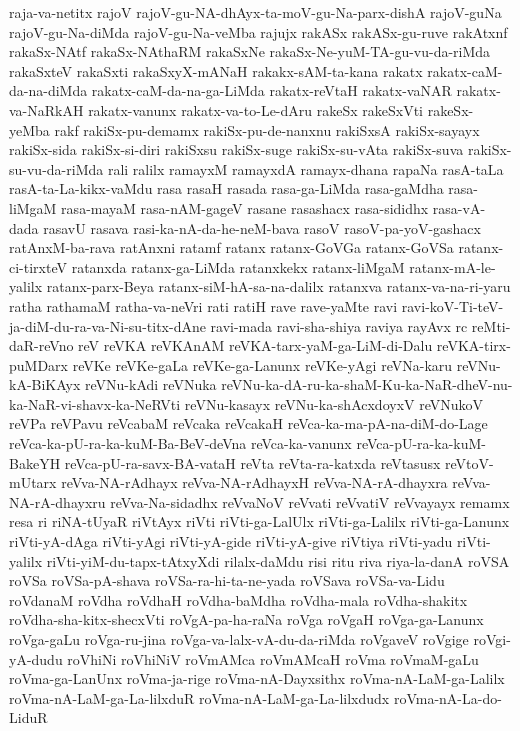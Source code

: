 {raja-va-netitx
rajoV
rajoV-gu-NA-dhAyx-ta-moV-gu-Na-parx-dishA
rajoV-guNa
rajoV-gu-Na-diMda
rajoV-gu-Na-veMba
rajujx
rakASx
rakASx-gu-ruve
rakAtxnf
rakaSx-NAtf
rakaSx-NAthaRM
rakaSxNe
rakaSx-Ne-yuM-TA-gu-vu-da-riMda
rakaSxteV
rakaSxti
rakaSxyX-mANaH
rakakx-sAM-ta-kana
rakatx
rakatx-caM-da-na-diMda
rakatx-caM-da-na-ga-LiMda
rakatx-reVtaH
rakatx-vaNAR
rakatx-va-NaRkAH
rakatx-vanunx
rakatx-va-to-Le-dAru
rakeSx
rakeSxVti
rakeSx-yeMba
rakf
rakiSx-pu-demamx
rakiSx-pu-de-nanxnu
rakiSxsA
rakiSx-sayayx
rakiSx-sida
rakiSx-si-diri
rakiSxsu
rakiSx-suge
rakiSx-su-vAta
rakiSx-suva
rakiSx-su-vu-da-riMda
rali
ralilx
ramayxM
ramayxdA
ramayx-dhana
rapaNa
rasA-taLa
rasA-ta-La-kikx-vaMdu
rasa
rasaH
rasada
rasa-ga-LiMda
rasa-gaMdha
rasa-liMgaM
rasa-mayaM
rasa-nAM-gageV
rasane
rasashacx
rasa-sididhx
rasa-vA-dada
rasavU
rasava
rasi-ka-nA-da-he-neM-bava
rasoV
rasoV-pa-yoV-gashacx
ratAnxM-ba-rava
ratAnxni
ratamf
ratanx
ratanx-GoVGa
ratanx-GoVSa
ratanx-ci-tirxteV
ratanxda
ratanx-ga-LiMda
ratanxkekx
ratanx-liMgaM
ratanx-mA-le-yalilx
ratanx-parx-Beya
ratanx-siM-hA-sa-na-dalilx
ratanxva
ratanx-va-na-ri-yaru
ratha
rathamaM
ratha-va-neVri
rati
ratiH
rave
rave-yaMte
ravi
ravi-koV-Ti-teV-ja-diM-du-ra-va-Ni-su-titx-dAne
ravi-mada
ravi-sha-shiya
raviya
rayAvx
rc
reMti-daR-reVno
reV
reVKA
reVKAnAM
reVKA-tarx-yaM-ga-LiM-di-Dalu
reVKA-tirx-puMDarx
reVKe
reVKe-gaLa
reVKe-ga-Lanunx
reVKe-yAgi
reVNa-karu
reVNu-kA-BiKAyx
reVNu-kAdi
reVNuka
reVNu-ka-dA-ru-ka-shaM-Ku-ka-NaR-dheV-nu-ka-NaR-vi-shavx-ka-NeRVti
reVNu-kasayx
reVNu-ka-shAcxdoyxV
reVNukoV
reVPa
reVPavu
reVcabaM
reVcaka
reVcakaH
reVca-ka-ma-pA-na-diM-do-Lage
reVca-ka-pU-ra-ka-kuM-Ba-BeV-deVna
reVca-ka-vanunx
reVca-pU-ra-ka-kuM-BakeYH
reVca-pU-ra-savx-BA-vataH
reVta
reVta-ra-katxda
reVtasusx
reVtoV-mUtarx
reVva-NA-rAdhayx
reVva-NA-rAdhayxH
reVva-NA-rA-dhayxra
reVva-NA-rA-dhayxru
reVva-Na-sidadhx
reVvaNoV
reVvati
reVvatiV
reVvayayx
remamx
resa
ri
riNA-tUyaR
riVtAyx
riVti
riVti-ga-LalUlx
riVti-ga-Lalilx
riVti-ga-Lanunx
riVti-yA-dAga
riVti-yAgi
riVti-yA-gide
riVti-yA-give
riVtiya
riVti-yadu
riVti-yalilx
riVti-yiM-du-tapx-tAtxyXdi
rilalx-daMdu
risi
ritu
riva
riya-la-danA
roVSA
roVSa
roVSa-pA-shava
roVSa-ra-hi-ta-ne-yada
roVSava
roVSa-va-Lidu
roVdanaM
roVdha
roVdhaH
roVdha-baMdha
roVdha-mala
roVdha-shakitx
roVdha-sha-kitx-shecxVti
roVgA-pa-ha-raNa
roVga
roVgaH
roVga-ga-Lanunx
roVga-gaLu
roVga-ru-jina
roVga-va-lalx-vA-du-da-riMda
roVgaveV
roVgige
roVgi-yA-dudu
roVhiNi
roVhiNiV
roVmAMca
roVmAMcaH
roVma
roVmaM-gaLu
roVma-ga-LanUnx
roVma-ja-rige
roVma-nA-Dayxsithx
roVma-nA-LaM-ga-Lalilx
roVma-nA-LaM-ga-La-lilxduR
roVma-nA-LaM-ga-La-lilxdudx
roVma-nA-La-do-LiduR
}
